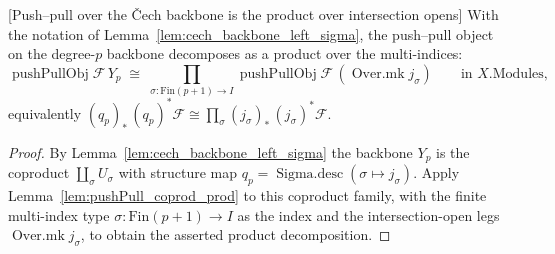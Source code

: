 \begin{lemma}

[Push--pull over the {\v C}ech backbone is the product over intersection opens]
  \label{lem:pushPull_sigma_iso}
  With the notation of Lemma~\ref{lem:cech_backbone_left_sigma}, the push--pull object on
  the degree-\(p\) backbone decomposes as a product over the multi-indices:
  \[
    \operatorname{pushPullObj}\mathcal{F}\,Y_p
      \;\cong\;
    \prod_{\sigma : \mathrm{Fin}(p+1) \to I}
      \operatorname{pushPullObj}\mathcal{F}\,(\operatorname{Over.mk} j_\sigma)
    \qquad \text{in } X.\mathrm{Modules},
  \]
  equivalently \((q_p)_*\,(q_p)^*\mathcal{F} \cong \prod_\sigma (j_\sigma)_*\,
  (j_\sigma)^*\mathcal{F}\).
\end{lemma}
\begin{proof}
  By Lemma~\ref{lem:cech_backbone_left_sigma} the backbone \(Y_p\) is the coproduct
  \(\coprod_\sigma U_\sigma\) with structure map \(q_p = \operatorname{Sigma.desc}(\sigma
  \mapsto j_\sigma)\). Apply Lemma~\ref{lem:pushPull_coprod_prod} to this coproduct family,
  with the finite multi-index type \(\sigma : \mathrm{Fin}(p+1) \to I\) as the index and the
  intersection-open legs \(\operatorname{Over.mk} j_\sigma\), to obtain the asserted product
  decomposition.
\end{proof}

